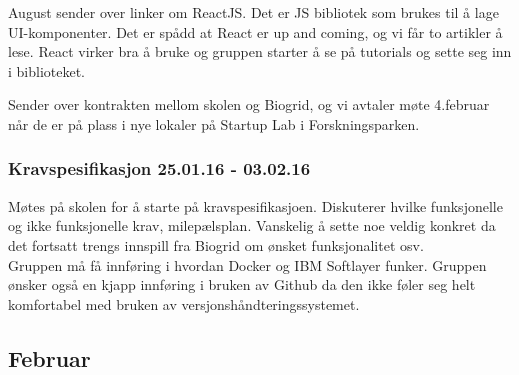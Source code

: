 \documentclass[12pt, oneside]{article}
\begin{document}
August sender over linker om ReactJS. Det er JS bibliotek som brukes til å lage UI-komponenter. Det er spådd at React er up and coming, og vi får to artikler å lese. React virker bra å bruke og gruppen starter å se på tutorials og sette seg inn i biblioteket. 

Sender over kontrakten mellom skolen og Biogrid, og vi avtaler møte 4.februar når de er på plass i nye lokaler på Startup Lab i Forskningsparken.

\subsubsection{Kravspesifikasjon 25.01.16 - 03.02.16}
Møtes på skolen for å starte på kravspesifikasjoen. Diskuterer hvilke funksjonelle og ikke funksjonelle krav, milepælsplan. Vanskelig å sette noe veldig konkret da det fortsatt trengs innspill fra Biogrid om ønsket funksjonalitet osv.\\
Gruppen må få innføring i hvordan Docker og IBM Softlayer funker. Gruppen ønsker også en kjapp innføring i bruken av Github da den ikke føler seg helt komfortabel med bruken av versjonshåndteringssystemet. 


\subsection{Februar}
\end{document}
